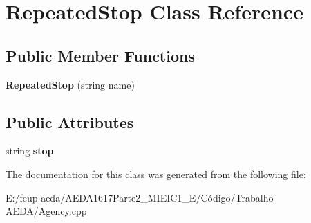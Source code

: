 \hypertarget{class_repeated_stop}{}\section{Repeated\+Stop Class Reference}
\label{class_repeated_stop}
\subsection*{Public Member Functions}
\begin{DoxyCompactItemize}
\item 
\mbox{\label{class_repeated_stop_a5d20d59ad7402d38d9a3605fd28180b8}} 
{\bfseries Repeated\+Stop} (string name)
\end{DoxyCompactItemize}
\subsection*{Public Attributes}
\begin{DoxyCompactItemize}
\item 
\mbox{\label{class_repeated_stop_a7c050f1a63c4344eee67fca69be0f44b}} 
string {\bfseries stop}
\end{DoxyCompactItemize}


The documentation for this class was generated from the following file\+:\begin{DoxyCompactItemize}
\item 
E\+:/feup-\/aeda/\+A\+E\+D\+A1617\+Parte2\+\_\+M\+I\+E\+I\+C1\+\_\+\+E/\+Código/\+Trabalho A\+E\+D\+A/Agency.\+cpp\end{DoxyCompactItemize}
